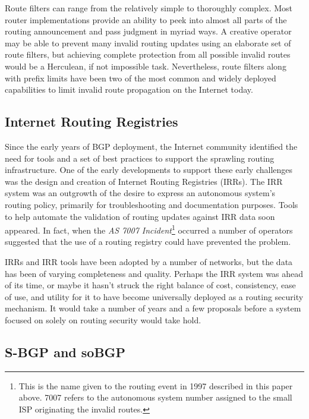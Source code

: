 \documentclass[sigconf]{acmart}
\begin{document}
Route filters can range from the relatively simple to thoroughly
complex.  Most router implementations provide an ability to peek into
almost all parts of the routing announcement and pass judgment in myriad
ways.  A creative operator may be able to prevent many invalid routing
updates using an elaborate set of route filters, but achieving complete
protection from all possible invalid routes would be a Herculean, if not
impossible task.  Nevertheless, route filters along with prefix limits
have been two of the most common and widely deployed capabilities to
limit invalid route propagation on the Internet
today.\cite{durand_bgp_2015}

\subsection{Internet Routing Registries}

Since the early years of BGP deployment, the Internet community
identified the need for tools and a set of best practices to support the
sprawling routing infrastructure.  One of the early developments to
support these early challenges was the design and creation of Internet
Routing Registries (IRRs).\cite{bates_representation_1995}  The IRR
system was an outgrowth of the desire to express an autonomous system's
routing policy, primarily for troubleshooting and documentation
purposes.  Tools to help automate the validation of routing updates
against IRR data soon appeared.  In fact, when the \emph{AS 7007
Incident}\footnote{This is the name given to the routing event in 1997
described in this paper above.  7007 refers to the autonomous system
number assigned to the small ISP originating the invalid routes.}
occurred a number of operators suggested that the use of a routing
registry could have prevented the problem.

IRRs and IRR tools have been adopted by a number of networks, but the
data has been of varying completeness and
quality.\cite{khan_comparative_2013}  Perhaps the IRR system was ahead
of its time, or maybe it hasn't struck the right balance of cost,
consistency, ease of use, and utility for it to have become universally
deployed as a routing security mechanism.  It would take a number of
years and a few proposals before a system focused on solely on routing
security would take hold.

\subsection{S-BGP and soBGP}
\end{document}
